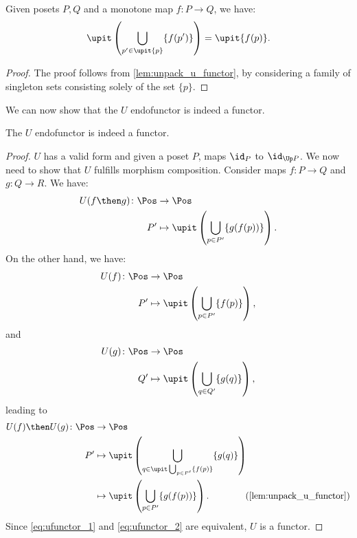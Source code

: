 \begin{lemma}
    \label{lem:unpack_part_2}
    Given posets $P,Q$ and a monotone map $f\colon P\to Q$, we have:
    \begin{equation}
        \upit \left( \bigcup_{p'\in \upit \{p\}} \{f(p')\}\right)=\upit \{f(p)\}.
    \end{equation}
\end{lemma}
\begin{proof}
    The proof follows from \cref{lem:unpack_u_functor}, by considering a family of singleton sets consisting solely of the set $\{p\}$.
\end{proof}
We can now show that the $U$ endofunctor is indeed a functor.
\begin{lemma}
    The $U$ endofunctor is indeed a functor.
\end{lemma}
\begin{proof}
    $U$ has a valid form and given a poset $P$, maps $\id_P$ to $\id_{\Up P}$. We now need to show that $U$ fulfills morphism composition. Consider maps $f\colon P \to Q$ and $g\colon Q \to R$. We have:
    \begin{equation}
        \label{eq:ufunctor_1}
        \begin{aligned}
            U(f\then g)\colon \Pos &\to \Pos\\
            P'&\mapsto \upit \left( \bigcup_{p\in P'} \{g(f(p))\}\right).
        \end{aligned}
    \end{equation}
    On the other hand, we have:
    \begin{equation}
        \begin{aligned}
            U(f)\colon \Pos &\to \Pos\\
            P'&\mapsto \upit \left( \bigcup_{p\in P'}\{f(p)\}\right),
        \end{aligned}
    \end{equation}
    and
    \begin{equation}
        \begin{aligned}
            U(g)\colon \Pos &\to \Pos\\
            Q'&\mapsto \upit \left( \bigcup_{q\in Q'}\{g(q)\}\right),
        \end{aligned}
    \end{equation}
    leading to
    \begin{equation}
        \label{eq:ufunctor_2}
        \begin{aligned}
            U(f)\then U(g)\colon \Pos &\to \Pos\\
            P'&\mapsto \upit\left( \bigcup_{q\in \upit \bigcup_{p\in P'}\{f(p)\}}\{g(q)\}\right)\\
            &\mapsto \upit \left(\bigcup_{p\in P'} \{ g(f(p))\}\right). \qquad \qquad (\cref{lem:unpack_u_functor})
        \end{aligned}
    \end{equation}
    Since \cref{eq:ufunctor_1} and \cref{eq:ufunctor_2} are equivalent, $U$ is a functor.
\end{proof}
